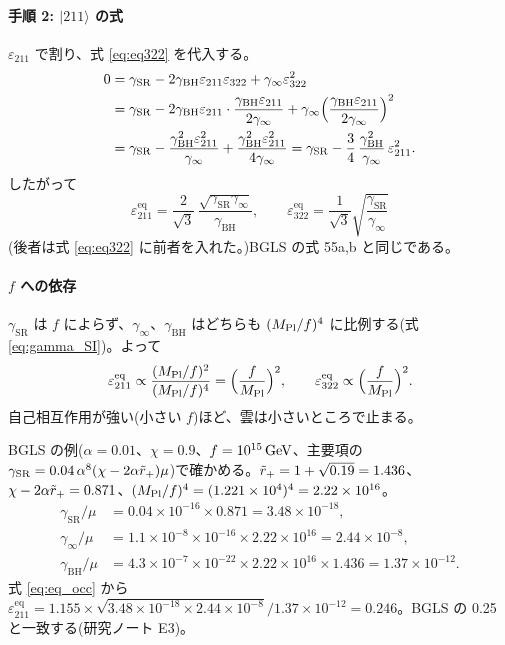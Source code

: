 \paragraph{手順 2: $|211\rangle$ の式}
$\varepsilon_{211}$ で割り、式 \eqref{eq:eq322} を代入する。
\begin{align}
0&=\gamma_\mathrm{SR}-2\gamma_\mathrm{BH}\varepsilon_{211}\varepsilon_{322}+\gamma_\infty\varepsilon_{322}^2\notag\\
&=\gamma_\mathrm{SR}-2\gamma_\mathrm{BH}\varepsilon_{211}\cdot\frac{\gamma_\mathrm{BH}\varepsilon_{211}}{2\gamma_\infty}+\gamma_\infty\Bigl(\frac{\gamma_\mathrm{BH}\varepsilon_{211}}{2\gamma_\infty}\Bigr)^2\notag\\
&=\gamma_\mathrm{SR}-\frac{\gamma_\mathrm{BH}^2\varepsilon_{211}^2}{\gamma_\infty}+\frac{\gamma_\mathrm{BH}^2\varepsilon_{211}^2}{4\gamma_\infty}
=\gamma_\mathrm{SR}-\frac34\,\frac{\gamma_\mathrm{BH}^2}{\gamma_\infty}\,\varepsilon_{211}^2.
\end{align}
したがって
\begin{equation}
\boxed{\;\varepsilon_{211}^\mathrm{eq}=\frac{2}{\sqrt3}\,\frac{\sqrt{\gamma_\mathrm{SR}\gamma_\infty}}{\gamma_\mathrm{BH}},\qquad
\varepsilon_{322}^\mathrm{eq}=\frac{1}{\sqrt3}\sqrt{\frac{\gamma_\mathrm{SR}}{\gamma_\infty}}\;}
\label{eq:eq_occ}
\end{equation}
(後者は式 \eqref{eq:eq322} に前者を入れた。)BGLS の式 55a,b と同じである。

\paragraph{$f$ への依存}
$\gamma_\mathrm{SR}$ は $f$ によらず、$\gamma_\infty$、$\gamma_\mathrm{BH}$ はどちらも $(M_\mathrm{Pl}/f)^4$ に比例する(式 \ref{eq:gamma_SI})。よって
\begin{equation}
\varepsilon_{211}^\mathrm{eq}\propto\frac{(M_\mathrm{Pl}/f)^2}{(M_\mathrm{Pl}/f)^4}=\Bigl(\frac{f}{M_\mathrm{Pl}}\Bigr)^2,\qquad
\varepsilon_{322}^\mathrm{eq}\propto\Bigl(\frac{f}{M_\mathrm{Pl}}\Bigr)^2.
\end{equation}
自己相互作用が強い(小さい $f$)ほど、雲は小さいところで止まる。

\begin{numcheck}
BGLS の例($\alpha=0.01$、$\chi=0.9$、$f=10^{15}\,\mathrm{GeV}$、主要項の $\gamma_\mathrm{SR}=0.04\,\alpha^8(\chi-2\alpha\tilde r_+)\mu$)で確かめる。$\tilde r_+=1+\sqrt{0.19}=1.436$、$\chi-2\alpha\tilde r_+=0.871$、$(M_\mathrm{Pl}/f)^4=(1.221\times10^4)^4=2.22\times10^{16}$。
\begin{align*}
\gamma_\mathrm{SR}/\mu&=0.04\times10^{-16}\times0.871=3.48\times10^{-18},\\
\gamma_\infty/\mu&=1.1\times10^{-8}\times10^{-16}\times2.22\times10^{16}=2.44\times10^{-8},\\
\gamma_\mathrm{BH}/\mu&=4.3\times10^{-7}\times10^{-22}\times2.22\times10^{16}\times1.436=1.37\times10^{-12}.
\end{align*}
式 \eqref{eq:eq_occ} から $\varepsilon_{211}^\mathrm{eq}=1.155\times\sqrt{3.48\times10^{-18}\times2.44\times10^{-8}}/1.37\times10^{-12}=0.246$。BGLS の 0.25 と一致する(研究ノート E3)。
\end{numcheck}

